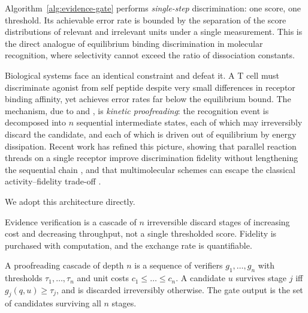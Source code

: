 Algorithm~\ref{alg:evidence-gate} performs \emph{single-step} discrimination: one score, one threshold. Its achievable error rate is bounded by the separation of the score distributions of relevant and irrelevant units under a single measurement. This is the direct analogue of equilibrium binding discrimination in molecular recognition, where selectivity cannot exceed the ratio of dissociation constants.

Biological systems face an identical constraint and defeat it. A T cell must discriminate agonist from self peptide despite very small differences in receptor binding affinity, yet achieves error rates far below the equilibrium bound. The mechanism, due to \citet{hopfield1974kinetic} and \citet{ninio1975kinetic}, is \emph{kinetic proofreading}: the recognition event is decomposed into $n$ sequential intermediate states, each of which may irreversibly discard the candidate, and each of which is driven out of equilibrium by energy dissipation. Recent work has refined this picture, showing that parallel reaction threads on a single receptor improve discrimination fidelity without lengthening the sequential chain \citep{kirby2025parallel}, and that multimolecular schemes can escape the classical activity--fidelity trade-off \citep{multimolecular2026}.

We adopt this architecture directly.

\begin{designprinciple}
Evidence verification is a cascade of $n$ irreversible discard stages of increasing cost and decreasing throughput, not a single thresholded score. Fidelity is purchased with computation, and the exchange rate is quantifiable.
\end{designprinciple}

\begin{definition}
\label{def:proofreading-cascade}
A proofreading cascade of depth $n$ is a sequence of verifiers $g_1, \dots, g_n$ with thresholds $\tau_1, \dots, \tau_n$ and unit costs $c_1 \leq \dots \leq c_n$. A candidate $u$ survives stage $j$ iff $g_j(q,u) \geq \tau_j$, and is discarded irreversibly otherwise. The gate output is the set of candidates surviving all $n$ stages.
\end{definition}

